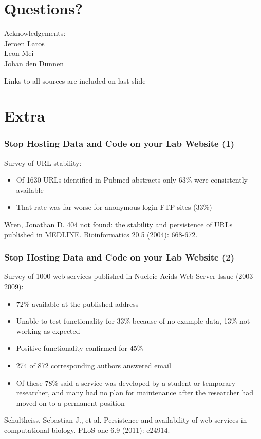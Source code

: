 \documentclass[slidestop]{beamer}
\begin{document}
\section{Questions?}
\lastpagetemplate
\begin{frame}
  \begin{center}
    Acknowledgements:\\
    \vspace{0.8cm}
    Jeroen Laros\\
    Leon Mei\\
    Johan den Dunnen
  \end{center}
  \vspace{1cm}
  {\tiny
    Links to all sources are included on last slide
  }
\end{frame}

\section*{Extra}

\extrapagetemplate
\begin{frame}
  \frametitle{Stop Hosting Data and Code on your Lab Website (1)}
  Survey of URL stability:
  \begin{itemize}
    \item Of 1630 URLs identified in Pubmed abstracts only 63\% were
      consistently available
    \item That rate was far worse for anonymous login FTP sites (33\%)
  \end{itemize}
  Wren, Jonathan D. 404 not found: the stability and persistence of URLs
  published in MEDLINE. Bioinformatics 20.5 (2004): 668-672.
\end{frame}

\extrapagetemplate
\begin{frame}
  \frametitle{Stop Hosting Data and Code on your Lab Website (2)}
  Survey of 1000 web services published in Nucleic Acids Web
  Server Issue (2003--2009):
  \begin{itemize}
    \item 72\% available at the published address
    \item Unable to test functionality for 33\% because of no example data,
      13\% not working as expected
    \item Positive functionality confirmed for 45\%
    \item 274 of 872 corresponding authors answered email
    \item Of these 78\% said a service was developed by a student or temporary
      researcher, and many had no plan for maintenance after the researcher
      had moved on to a permanent position
  \end{itemize}
  Schultheiss, Sebastian J., et al. Persistence and availability of web
  services in computational biology. PLoS one 6.9 (2011): e24914.
\end{frame}
\end{document}
